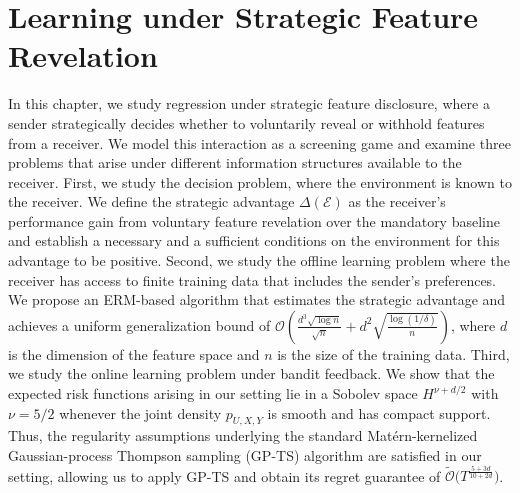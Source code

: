 \chapter{Learning under Strategic Feature Revelation}
\label{ch:strat_rev}
\graphicspath{{Chapter_4_Strategic_Revelation/figures/}}

In this chapter, we study regression under strategic feature disclosure, where a sender strategically decides whether to voluntarily reveal or withhold features from a receiver. We model this interaction as a screening game and examine three problems that arise under different information structures available to the receiver. First, we study the decision problem, where the environment is known to the receiver. We define the strategic advantage $\Delta(\mathcal{E})$ as the receiver's performance gain from voluntary feature revelation over the mandatory baseline and establish a necessary and a sufficient conditions on the environment for this advantage to be positive. Second, we study the offline learning problem where the receiver has access to finite training data that includes the sender's preferences. We propose an ERM-based algorithm that estimates the strategic advantage and achieves a uniform generalization bound of $\mathcal{O}\left(\frac{d^3 \sqrt{\log n}}{\sqrt{n}} + d^2\sqrt{\frac{\log(1/\delta)}{n}}\right)$, where $d$ is the dimension of the feature space and $n$ is the size of the training data. Third, we study the online learning problem under bandit feedback. We show that the expected risk functions arising in our setting lie in a Sobolev space $H^{\nu+d/2}$ with $\nu=5/2$ whenever the joint density $p_{U,X,Y}$ is smooth and has compact support. Thus, the regularity assumptions underlying the standard Matérn-kernelized Gaussian-process Thompson sampling (GP-TS) algorithm are satisfied in our setting, allowing us to apply GP-TS and obtain its regret guarantee of $\widetilde{\mathcal{O}}\bigl(T^{\frac{5+3d}{10+2d}}\bigr)$.








